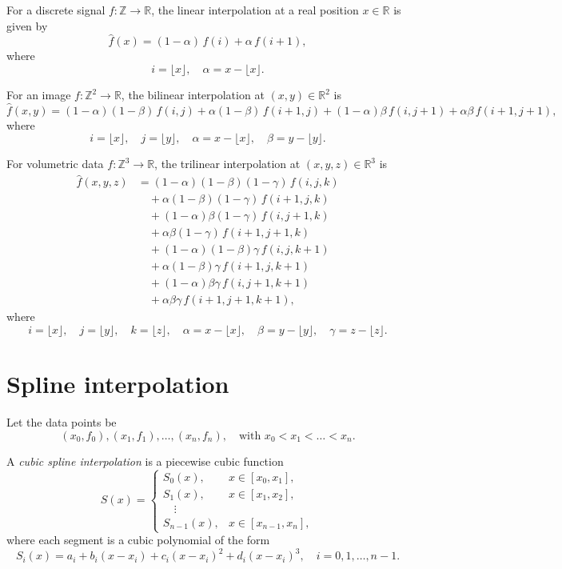 For a discrete signal $f: \mathbb{Z} \to \mathbb{R}$, the linear interpolation 
at a real position $x \in \mathbb{R}$ is given by
\[
\hat{f}(x) = (1 - \alpha)\, f(i) + \alpha \, f(i+1),
\]
where 
\[
i = \lfloor x \rfloor, \quad \alpha = x - \lfloor x \rfloor.
\]

For an image $f: \mathbb{Z}^2 \to \mathbb{R}$, the bilinear interpolation at 
$(x,y) \in \mathbb{R}^2$ is
\[
\hat{f}(x,y) = (1-\alpha)(1-\beta)\, f(i,j) 
+ \alpha(1-\beta)\, f(i+1,j) 
+ (1-\alpha)\beta\, f(i,j+1) 
+ \alpha\beta\, f(i+1,j+1),
\]
where
\[
i = \lfloor x \rfloor, \quad j = \lfloor y \rfloor, \quad
\alpha = x - \lfloor x \rfloor, \quad \beta = y - \lfloor y \rfloor.
\]

For volumetric data $f: \mathbb{Z}^3 \to \mathbb{R}$, the trilinear interpolation at 
$(x,y,z) \in \mathbb{R}^3$ is
\[
\begin{aligned}
\hat{f}(x,y,z) &= (1-\alpha)(1-\beta)(1-\gamma)\, f(i,j,k) \\
&\quad + \alpha(1-\beta)(1-\gamma)\, f(i+1,j,k) \\
&\quad + (1-\alpha)\beta(1-\gamma)\, f(i,j+1,k) \\
&\quad + \alpha\beta(1-\gamma)\, f(i+1,j+1,k) \\
&\quad + (1-\alpha)(1-\beta)\gamma\, f(i,j,k+1) \\
&\quad + \alpha(1-\beta)\gamma\, f(i+1,j,k+1) \\
&\quad + (1-\alpha)\beta\gamma\, f(i,j+1,k+1) \\
&\quad + \alpha\beta\gamma\, f(i+1,j+1,k+1),
\end{aligned}
\]
where
\[
i = \lfloor x \rfloor, \quad j = \lfloor y \rfloor, \quad k = \lfloor z \rfloor,
\quad \alpha = x - \lfloor x \rfloor, \quad \beta = y - \lfloor y \rfloor,
\quad \gamma = z - \lfloor z \rfloor.
\]

\section{Spline interpolation}


Let the data points be 
\[
(x_0, f_0), (x_1, f_1), \dots, (x_n, f_n), 
\quad \text{with } x_0 < x_1 < \dots < x_n.
\]

A \emph{cubic spline interpolation} is a piecewise cubic function 
\[
S(x) =
\begin{cases}
S_0(x), & x \in [x_0, x_1], \\
S_1(x), & x \in [x_1, x_2], \\
\quad \vdots \\
S_{n-1}(x), & x \in [x_{n-1}, x_n],
\end{cases}
\]
where each segment is a cubic polynomial of the form
\[
S_i(x) = a_i + b_i (x - x_i) + c_i (x - x_i)^2 + d_i (x - x_i)^3,
\quad i = 0,1,\dots,n-1.
\]

